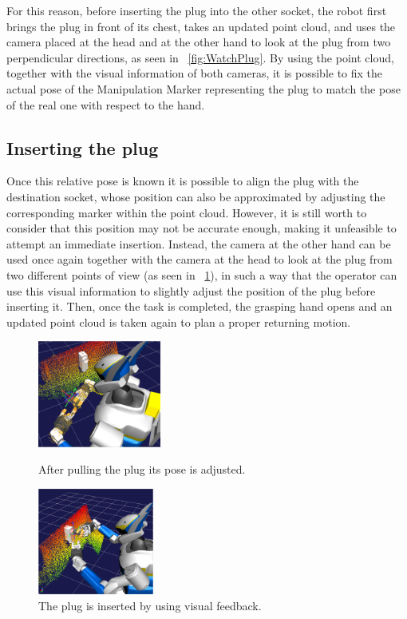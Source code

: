		For this reason, before inserting the plug into the other socket, the robot first brings the plug
		in front of its chest, takes an updated point cloud, and uses the camera placed at the head and
		at the other hand to look at the plug from two perpendicular directions, as seen in
		\figurename~\ref{fig:WatchPlug}.
		By using the point cloud, together with the visual information of both cameras, it is possible to
		fix the actual pose of the Manipulation Marker representing the plug to match the pose of
		the real one with respect to the hand.
		
	\subsection{Inserting the plug}
		
		Once this relative pose is known it is possible to align the plug with the destination socket,
		whose position can also be approximated by adjusting the corresponding marker within the point cloud.
		However, it is still worth to consider that this position may not be accurate enough,
		making it unfeasible to attempt an immediate insertion.
		Instead, the camera at the other hand can be used once again together with the camera at the head to
		look at the plug from two different points of view (as seen in \figurename~\ref{fig:InsertPlug}),
		in such a way that the operator can use this visual	information to slightly adjust the position of the
		plug before inserting it.
		Then, once the task is completed, the grasping hand opens and an updated point cloud is taken again
		to plan a proper returning motion.
		
		\begin{figure}[t]
			\centering
			\begin{minipage}[t]{0.475\linewidth}
				\centering
				\includegraphics[height = 3.5cm]{img/WatchPlug}
				\caption{After pulling the plug its pose is adjusted.}
				\label{fig:WatchPlug}
			\end{minipage}
			\hspace{0.1cm}
			\begin{minipage}[t]{0.475\linewidth}
				\centering
				\includegraphics[height = 3.5cm]{img/InsertPlug}
				\caption{The plug is inserted by using visual feedback.}
				\label{fig:InsertPlug}
			\end{minipage}
		\end{figure}
		

